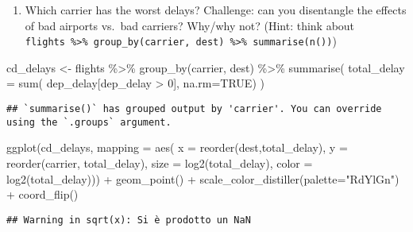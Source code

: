 \documentclass[
]{article}
\newenvironment{Shaded}{\begin{snugshade}}{\end{snugshade}}
\newcommand{\AttributeTok}[1]{\textcolor[rgb]{0.77,0.63,0.00}{#1}}
\newcommand{\ConstantTok}[1]{\textcolor[rgb]{0.00,0.00,0.00}{#1}}
\newcommand{\DecValTok}[1]{\textcolor[rgb]{0.00,0.00,0.81}{#1}}
\newcommand{\FunctionTok}[1]{\textcolor[rgb]{0.00,0.00,0.00}{#1}}
\newcommand{\NormalTok}[1]{#1}
\newcommand{\OtherTok}[1]{\textcolor[rgb]{0.56,0.35,0.01}{#1}}
\newcommand{\SpecialCharTok}[1]{\textcolor[rgb]{0.00,0.00,0.00}{#1}}
\newcommand{\StringTok}[1]{\textcolor[rgb]{0.31,0.60,0.02}{#1}}
\providecommand{\tightlist}{%
  \setlength{\itemsep}{0pt}\setlength{\parskip}{0pt}}
\begin{document}
\begin{enumerate}
\def\labelenumi{\arabic{enumi}.}
\tightlist
\item
  Which carrier has the worst delays? Challenge: can you disentangle the
  effects of bad airports vs.~bad carriers? Why/why not? (Hint: think
  about
  \texttt{flights\ \%\textgreater{}\%\ group\_by(carrier,\ dest)\ \%\textgreater{}\%\ summarise(n())})
\end{enumerate}

\begin{Shaded}
\begin{Highlighting}[]
\NormalTok{cd\_delays }\OtherTok{\textless{}{-}}\NormalTok{ flights }\SpecialCharTok{\%\textgreater{}\%} 
  \FunctionTok{group\_by}\NormalTok{(carrier, dest) }\SpecialCharTok{\%\textgreater{}\%} 
  \FunctionTok{summarise}\NormalTok{( }\AttributeTok{total\_delay =} \FunctionTok{sum}\NormalTok{( dep\_delay[dep\_delay }\SpecialCharTok{\textgreater{}} \DecValTok{0}\NormalTok{], }\AttributeTok{na.rm=}\ConstantTok{TRUE}\NormalTok{) )}
\end{Highlighting}
\end{Shaded}

\begin{verbatim}
## `summarise()` has grouped output by 'carrier'. You can override using the `.groups` argument.
\end{verbatim}

\begin{Shaded}
\begin{Highlighting}[]
\FunctionTok{ggplot}\NormalTok{(cd\_delays,}
       \AttributeTok{mapping =} \FunctionTok{aes}\NormalTok{( }\AttributeTok{x =} \FunctionTok{reorder}\NormalTok{(dest,total\_delay), }
                      \AttributeTok{y =} \FunctionTok{reorder}\NormalTok{(carrier, total\_delay),}
                      \AttributeTok{size =} \FunctionTok{log2}\NormalTok{(total\_delay),}
                      \AttributeTok{color =} \FunctionTok{log2}\NormalTok{(total\_delay))) }\SpecialCharTok{+}
  \FunctionTok{geom\_point}\NormalTok{() }\SpecialCharTok{+}
  \FunctionTok{scale\_color\_distiller}\NormalTok{(}\AttributeTok{palette=}\StringTok{"RdYlGn"}\NormalTok{) }\SpecialCharTok{+}
  \FunctionTok{coord\_flip}\NormalTok{()}
\end{Highlighting}
\end{Shaded}

\begin{verbatim}
## Warning in sqrt(x): Si è prodotto un NaN
\end{verbatim}
\end{document}

